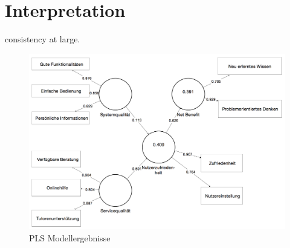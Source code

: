 \section{Interpretation}
\label{sec:vergleich}

\todo consistency at large. 




\begin{figure}[h]
\centering
\includegraphics[width=1\textwidth]{Grafiken/pls_bw_2.png}
\caption{PLS Modellergebnisse}
\label{PLS Modellergebnisse}
\end{figure}